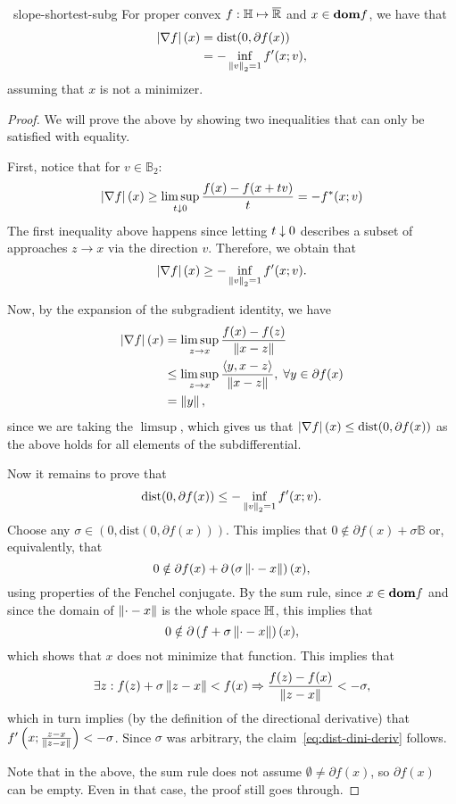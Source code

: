 \begin{ctheorem}{~}{slope-shortest-subg}
	For proper convex $f: \mathbb{H} \mapsto \overline{\mathbb{R}}$ and $x \in \textbf{dom} f$, we
	have that
	\begin{align*}
		\left| \nabla f \right|(x) &= \mathrm{dist}(0, \partial f(x)) \\
						 &= -\inf_{\left \| v \right \|_2 = 1} f'(x; v),
	\end{align*}
	assuming that $x$ is not a minimizer.
\end{ctheorem}
\begin{proof}
	We will prove the above by showing two inequalities that can only be
	satisfied with equality.

	First, notice that for $v \in \mathbb{B}_2$:
	\[
		\left| \nabla f \right|(x) \geq \limsup_{t \downarrow 0} \frac{f(x) - f(x + tv)}{t}
		= - f^*(x; v)
	\]
	The first inequality above happens since letting $t \downarrow 0$ describes a
	subset of approaches $z \to x$ via the direction $v$. Therefore, we obtain
	that
	\[
		\left| \nabla f \right|(x) \geq -\inf_{\left \| v \right \|_2 = 1} f'(x; v).
	\]

	Now, by the expansion of the subgradient identity, we have
	\begin{align*}
		\left| \nabla f \right|(x) &= \limsup_{z \to x} \frac{f(x) - f(z)}{\left \| x - z \right \|}
					  \\ &\leq \limsup_{z \to x} \frac{\left\langle y, x - z \right\rangle}{\left \| x -
z \right \|}, \; \forall y \in \partial f(x) \\
		&= \left \| y \right \|,
	\end{align*}
	since we are taking the $\limsup$, which gives us that $\left| \nabla f \right|(x)
	\leq \mathrm{dist}(0, \partial f(x))$ as the above holds for all elements
	of the subdifferential.

	Now it remains to prove that
	\begin{equation}
		\mathrm{dist}(0, \partial f(x)) \leq -\inf_{\left \| v \right \|_2 = 1} f'(x; v).
		\label{eq:dist-dini-deriv}
	\end{equation}
	Choose any $\sigma \in (0, \mathrm{dist}(0, \partial f(x)))$. This implies
	that $0 \notin \partial f(x) + \sigma \mathbb{B}$ or, equivalently, that
	\[
		0 \notin \partial f(x) + \partial \left(\sigma \left \| \cdot -
		x \right \|\right)(x),
	\]
	using properties of the Fenchel conjugate. By the sum rule, since $x \in
	\textbf{dom} f$ and since the domain of $\left \| \cdot - x \right \|$ is the whole space
	$\mathbb{H}$, this implies that
	\[
		0 \notin \partial \left( f + \sigma \left \| \cdot - x \right \| \right)(x),
	\]
	which shows that $x$ does not minimize that function. This implies that
	\[
		\exists z: f(z) + \sigma \left \| z - x \right \| < f(x) \Rightarrow
		\frac{f(z) - f(x)}{\left \| z - x \right \|} < -\sigma,
	\]
	which in turn implies (by the definition of the directional derivative)
	that $f'\left(x; \frac{z - x}{\left \| z - x \right \|}\right) < -\sigma$. Since
	$\sigma$ was arbitrary, the claim~\eqref{eq:dist-dini-deriv} follows.

	Note that in the above, the sum rule does not assume $\emptyset \neq
	\partial f(x)$, so $\partial f(x)$ can be empty. Even in that case, the proof
	still goes through.
\end{proof}
